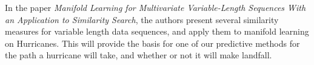 
In the paper \textit{Manifold Learning for Multivariate Variable-Length Sequences With an Application to Similarity Search}, the authors present several similarity measures for variable length data sequences, and apply them to manifold learning on Hurricanes. This will provide the basis for one of our predictive methods for the path a hurricane will take, and whether or not it will make landfall.